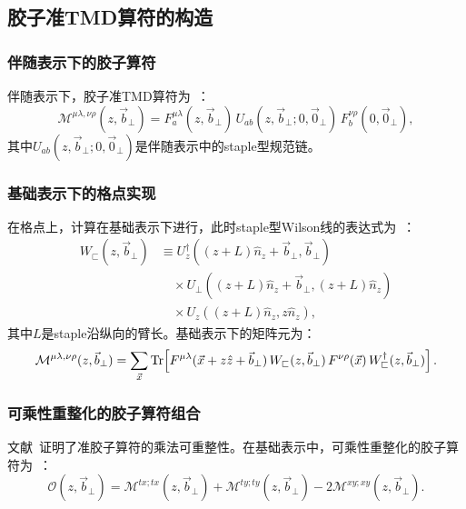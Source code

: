 \documentclass[12pt,a4paper]{ctexart}
\theoremstyle{definition}
\begin{document}
\subsection{胶子准TMD算符的构造}

\subsubsection{伴随表示下的胶子算符}

伴随表示下，胶子准TMD算符为~\cite{Balitsky:2019krj}：
\begin{equation}\label{eq:M_adj_tmd}
    \mathcal{M}^{\mu\lambda,\nu\rho}(z, \vec{b}_\perp) = F^{\mu\lambda}_a(z, \vec{b}_\perp) \, U_{ab}(z, \vec{b}_\perp; 0, \vec{0}_\perp) \, F^{\nu\rho}_b(0, \vec{0}_\perp),
\end{equation}
其中$U_{ab}(z, \vec{b}_\perp; 0, \vec{0}_\perp)$是伴随表示中的staple型规范链。

\subsubsection{基础表示下的格点实现}

在格点上，计算在基础表示下进行，此时staple型Wilson线的表达式为~\cite{Zhang2022renormTMD}：
\begin{equation}\label{eq:staple_wilson}
\begin{aligned}
W_{\sqsubset}(z, \vec{b}_\perp) &\equiv U_z^\dagger((z+L)\hat{n}_z + \vec{b}_\perp, \vec{b}_\perp) \\
&\quad \times U_\perp((z+L)\hat{n}_z + \vec{b}_\perp, (z+L)\hat{n}_z) \\
&\quad \times U_z((z+L)\hat{n}_z, z\hat{n}_z),
\end{aligned}
\end{equation}
其中$L$是staple沿纵向的臂长。基础表示下的矩阵元为：
\begin{equation}\label{eq:M_fund_tmd}
    \mathcal{M}^{\mu\lambda,\nu\rho}(z, \vec{b}_\perp) = \sum_{\vec{x}} \Tr\!\left[F^{\mu\lambda}(\vec{x}+z\hat{z}+\vec{b}_\perp) \, W_{\sqsubset}(z, \vec{b}_\perp) \, F^{\nu\rho}(\vec{x}) \, W_{\sqsubset}^\dagger(z, \vec{b}_\perp)\right].
\end{equation}

\subsubsection{可乘性重整化的胶子算符组合}

文献~\cite{Li:2018uif,Zhang:2018diw}证明了准胶子算符的乘法可重整性。在基础表示中，可乘性重整化的胶子算符为~\cite{Balitsky:2019krj,Chen2025gluon}：
\begin{equation}\label{eq:O_mult_tmd}
    \mathcal{O}(z, \vec{b}_\perp) = \mathcal{M}^{tx;tx}(z, \vec{b}_\perp) + \mathcal{M}^{ty;ty}(z, \vec{b}_\perp) - 2\mathcal{M}^{xy;xy}(z, \vec{b}_\perp).
\end{equation}
\end{document}
